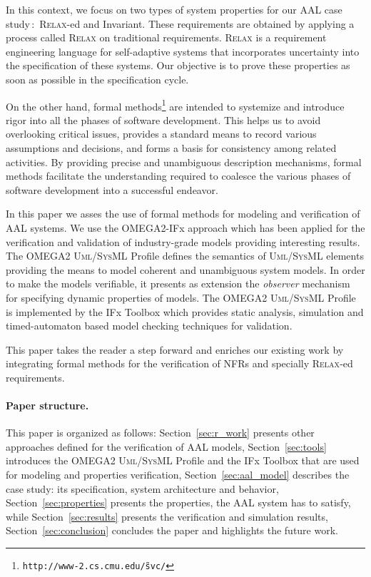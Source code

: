 \documentclass[a4paper,twoside]{article}
\def\myrelax{\textsc{Relax}}                  %
\def\UML{\textsc{Uml}}
\def\SysML{\textsc{SysML}}
\begin{document}
In this context, we focus on two types of system properties for our AAL case study\,:~\myrelax{}-ed and Invariant. These requirements are obtained by applying a process called  \myrelax{} \cite{JWhittle2009} on traditional requirements. \myrelax{}  is  a  requirement  engineering language for self-adaptive systems that incorporates uncertainty into the specification of these systems. Our objective is to prove these properties as soon as possible in the specification cycle.

On the other hand, formal methods\footnote{\texttt{http://www-2.cs.cmu.edu/\~svc/}} are intended to systemize and introduce rigor into all the phases of software development. This helps us to avoid overlooking critical issues, provides a standard means to record various assumptions and decisions, and forms a basis for consistency among related activities. By providing precise and unambiguous description mechanisms, formal methods facilitate the understanding required to coalesce the various phases of software development into a successful endeavor.  

In this paper we asses the use of formal methods for modeling and verification of AAL systems. We use the OMEGA2-IFx approach which has been applied for the verification and validation of industry-grade models \cite{IDragomir2012} providing interesting results. The OMEGA2 \UML{}/\SysML{} Profile \cite{IOber2010} defines the semantics of \UML{}/\SysML{} elements providing the means to model coherent and unambiguous system models. In order to make the models verifiable, it presents as extension the \textit{observer} mechanism for specifying dynamic properties of models. The OMEGA2 \UML{}/\SysML{} Profile is implemented by the IFx Toolbox \cite{IOber2006} which provides static analysis, simulation and timed-automaton based model checking \cite{EMClarke1999} techniques for validation.

This paper takes the reader a step forward and enriches our existing work by integrating formal methods for the verification of NFRs and specially  \myrelax{}-ed requirements.

\paragraph*{Paper structure.} This paper is organized as follows: Section~\ref{sec:r_work} presents other approaches defined for the verification of AAL models, Section~\ref{sec:tools} introduces the OMEGA2 \UML{}/\SysML{} Profile and the IFx Toolbox that are used for modeling and properties verification, Section~\ref{sec:aal_model} describes the case study: its specification, system architecture and behavior, Section~\ref{sec:properties} presents the properties, the AAL system has to satisfy, while Section~\ref{sec:results} presents the verification and simulation results, Section~\ref{sec:conclusion} concludes the paper and highlights the future work.
\end{document}
